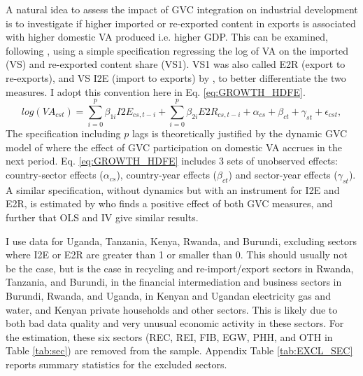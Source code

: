 \documentclass[a4paper]{article}
\begin{document}
A natural idea to assess the impact of GVC integration on industrial development is to investigate if higher imported or re-exported content in exports is associated with higher domestic VA produced i.e. higher GDP. This can be examined, following \citet{kummritz2015global}, using a simple specification regressing the log of VA on the imported (VS) and re-exported content share (VS1). VS1 was also called E2R (export to re-exports), and VS I2E (import to exports) by \citet{baldwin2015supply}, to better differentiate the two measures. I adopt this convention here in Eq. \ref{eq:GROWTH_HDFE}. 
\begin{equation} \label{eq:GROWTH_HDFE}
log(VA_{cst}) = \sum_{i=0}^p \beta_{1i} I2E_{cs,t-i} + \sum_{i = 0}^p \beta_{2i} E2R_{cs,t-i}  + \alpha_{cs} + \beta_{ct} +\gamma_{st} + \epsilon_{cst},
\end{equation}
The specification including $p$ lags is theoretically justified by the dynamic GVC model of \citet{LiLiu2015moving} where the effect of GVC participation on domestic VA accrues in the next period. Eq. \ref{eq:GROWTH_HDFE} includes 3 sets of unobserved effects: country-sector effects ($\alpha_{cs}$), country-year effects ($\beta_{ct}$) and sector-year effects ($\gamma_{st}$). A similar specification, without dynamics but with an instrument for I2E and E2R, is estimated by \citet{Kummritz20161} who finds a positive effect of both GVC measures, and further that OLS and IV give similar results. \newline %


I use data for Uganda, Tanzania, Kenya, Rwanda, and Burundi, excluding sectors where I2E or E2R are greater than 1 or smaller than 0. This should usually not be the case, but is the case in recycling and re-import/export sectors in Rwanda, Tanzania, and Burundi, in the financial intermediation and business sectors in Burundi, Rwanda, and Uganda, in Kenyan and Ugandan electricity gas and water, and Kenyan private households and other sectors. This is likely due to both bad data quality and very unusual economic activity in these sectors. For the estimation, these six sectors (REC, REI, FIB, EGW, PHH, and OTH in Table \ref{tab:sec}) are removed from the sample. %
Appendix Table \ref{tab:EXCL_SEC} reports summary statistics for the excluded sectors. \newline
\end{document}
